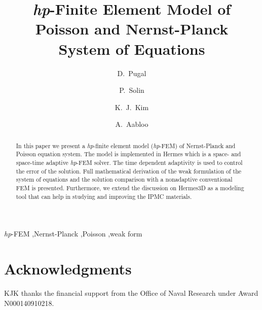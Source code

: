 \documentclass[letterpaper,3p]{elsarticle}
\begin{document}
\begin{frontmatter}

\title{\emph{hp}-Finite Element Model of Poisson and Nernst-Planck\\ System of Equations}

\author[unrme,tartu]{D.~Pugal}

\author[unrmath,czech]{P.~Solin}

\author[unrme]{K.~J.~Kim}

\author[tartu]{A.~Aabloo}

\address[unrme]{Mechanical Engineering Department, University of Nevada, Reno, NV, U.S.A.}
\address[unrmath]{Department of Mathematics and Statistics,
University of Nevada, Reno, NV, U.S.A.}
\address[czech]{Institute of Thermomechanics, Prague, Czech Republic}
\address[tartu]{Institute of Technology, Tartu University, Estonia}


\begin{abstract}
 In this paper we present a \emph{hp}-finite element
model (\emph{hp}-FEM) of Nernst-Planck and Poisson equation system.
The model is implemented in Hermes which is a
space- and space-time adaptive \emph{hp}-FEM solver. The time dependent
adaptivity is used to control the error of the solution. Full mathematical
derivation of the weak formulation of the system of equations and
the solution comparison with a nonadaptive conventional FEM is presented.
Furthermore, we extend the discussion on Hermes3D as a modeling tool that can
help in studying and improving the IPMC materials.
\end{abstract}

\begin{keyword}
  \emph{hp}-FEM \sep Nernst-Planck \sep Poisson \sep weak form
\end{keyword}

\end{frontmatter}







\section*{Acknowledgments}
KJK thanks the financial support from the Office of Naval Research under Award N000140910218.


\end{document}
